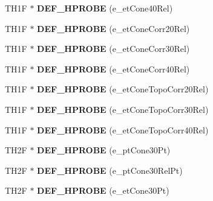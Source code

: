 \begin{DoxyCompactItemize}
\item 
\hypertarget{classHistos__Fake_ac026c6d1b881b3ac97d28379a4bde2be}{
TH1F $\ast$ {\bfseries DEF\_\-HPROBE} (e\_\-etCone40Rel)}
\label{classHistos__Fake_ac026c6d1b881b3ac97d28379a4bde2be}

\item 
\hypertarget{classHistos__Fake_a9968d92c31dddbb4cb05b2dbfb3bec2e}{
TH1F $\ast$ {\bfseries DEF\_\-HPROBE} (e\_\-etConeCorr20Rel)}
\label{classHistos__Fake_a9968d92c31dddbb4cb05b2dbfb3bec2e}

\item 
\hypertarget{classHistos__Fake_a57d34dc7723e31f9a48a48d71f97a315}{
TH1F $\ast$ {\bfseries DEF\_\-HPROBE} (e\_\-etConeCorr30Rel)}
\label{classHistos__Fake_a57d34dc7723e31f9a48a48d71f97a315}

\item 
\hypertarget{classHistos__Fake_affe586548dea4430f54b866ba547d462}{
TH1F $\ast$ {\bfseries DEF\_\-HPROBE} (e\_\-etConeCorr40Rel)}
\label{classHistos__Fake_affe586548dea4430f54b866ba547d462}

\item 
\hypertarget{classHistos__Fake_a61f69a04c83eae026e9e2b1423da6498}{
TH1F $\ast$ {\bfseries DEF\_\-HPROBE} (e\_\-etConeTopoCorr20Rel)}
\label{classHistos__Fake_a61f69a04c83eae026e9e2b1423da6498}

\item 
\hypertarget{classHistos__Fake_a57cf14dbc08663cd9e95068d6b3c8cf0}{
TH1F $\ast$ {\bfseries DEF\_\-HPROBE} (e\_\-etConeTopoCorr30Rel)}
\label{classHistos__Fake_a57cf14dbc08663cd9e95068d6b3c8cf0}

\item 
\hypertarget{classHistos__Fake_a0995cf6405e200c56ddafd00dff6a376}{
TH1F $\ast$ {\bfseries DEF\_\-HPROBE} (e\_\-etConeTopoCorr40Rel)}
\label{classHistos__Fake_a0995cf6405e200c56ddafd00dff6a376}

\item 
\hypertarget{classHistos__Fake_a2132c920e3a0d5b0620839a3c8c637c7}{
TH2F $\ast$ {\bfseries DEF\_\-HPROBE} (e\_\-ptCone30Pt)}
\label{classHistos__Fake_a2132c920e3a0d5b0620839a3c8c637c7}

\item 
\hypertarget{classHistos__Fake_a817ab3812f66a9c89568e5df818c2df3}{
TH2F $\ast$ {\bfseries DEF\_\-HPROBE} (e\_\-ptCone30RelPt)}
\label{classHistos__Fake_a817ab3812f66a9c89568e5df818c2df3}

\item 
\hypertarget{classHistos__Fake_a93116f31d5e621fcac5c3bbfb5fbce5c}{
TH2F $\ast$ {\bfseries DEF\_\-HPROBE} (e\_\-etCone30Pt)}
\label{classHistos__Fake_a93116f31d5e621fcac5c3bbfb5fbce5c}


\end{DoxyCompactItemize}

